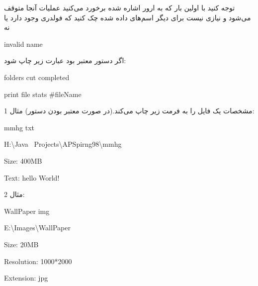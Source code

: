 \documentclass[]{article}
\begin{document}
توجه کنید با اولین بار که به ارور اشاره شده برخورد می‌کنید عملیات آنجا متوقف می‌شود و نیازی نیست برای دیگر اسم‌های داده شده چک کنید که فولدری وجود دارد یا نه

\begin{tcolorbox}[boxrule=0pt]
	\begin{latin}
  	  \large{
invalid name
		}
	\end{latin}
\end{tcolorbox}

اگر دستور معتبر بود عبارت زیر چاپ شود:

\begin{tcolorbox}[boxrule=0pt]
	\begin{latin}
  	  \large{
folders cut completed
		}
	\end{latin}
\end{tcolorbox}


\begin{tcolorbox}[boxrule=0pt]
	\begin{latin}
  	  \large{
print file stats \#fileName
		}
	\end{latin}
\end{tcolorbox}

مشخصات یک فایل را به فرمت زیر چاپ می‌کند.(در صورت معتبر بودن دستور)
مثال 1:



\begin{tcolorbox}[boxrule=0pt]
	\begin{latin}
  	  \large{
mmhg txt

H:\textbackslash Java~ Projects\textbackslash APSpirng98\textbackslash mmhg

Size: 400MB

Text: hello World!
		}
	\end{latin}
\end{tcolorbox}


مثال 2:

\begin{tcolorbox}[boxrule=0pt]
	\begin{latin}
  	  \large{
WallPaper img


E:\textbackslash Images\textbackslash WallPaper


Size: 20MB


Resolution: 1000*2000


Extension: jpg


		}
	\end{latin}
\end{tcolorbox}
\end{document}
